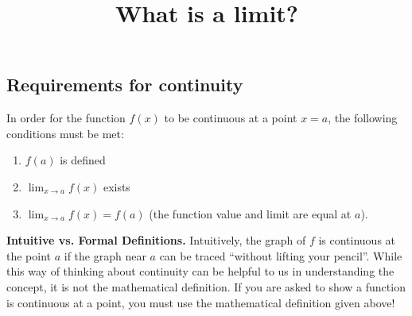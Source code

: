 \documentclass{ximera}
\title{What is a limit?}
\begin{document}
\begin{abstract}
\end{abstract}

\subsection{Requirements for continuity}

In order for the function $f(x)$ to be continuous at a point $x=a$, the following conditions must be met:
\begin{enumerate}
    \item $f(a)$ is defined
    \item $\lim_{x \to a} f(x)$ exists
    \item $\lim_{x \to a} f(x) = f(a)$ (the function value and limit are equal at $a$).
\end{enumerate}

\begin{explanation}
    \textbf{Intuitive vs. Formal Definitions.} Intuitively, the graph of $f$ is continuous at the point $a$ if the graph near $a$ can be traced ``without lifting your pencil''. While this way of thinking about continuity can be helpful to us in understanding the concept, it is not the mathematical definition. If you are asked to show a function is continuous at a point, you must use the mathematical definition given above!
\end{explanation}
\end{document}
